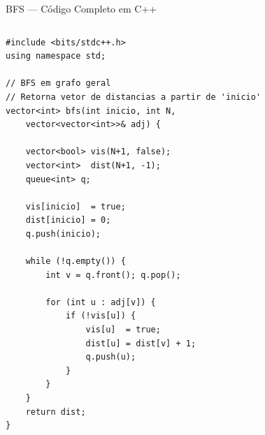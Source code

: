 \documentclass[aspectratio=169,10pt]{beamer}
\begin{document}
\begin{frame}[fragile,shrink=3]{BFS --- Código Completo em C++}
  \begin{columns}[t]
      \begin{tcolorbox}[caixaCodigo]
        \begin{lstlisting}[style=cppsmall]
#include <bits/stdc++.h>
using namespace std;

// BFS em grafo geral
// Retorna vetor de distancias a partir de 'inicio'
vector<int> bfs(int inicio, int N,
    vector<vector<int>>& adj) {

    vector<bool> vis(N+1, false);
    vector<int>  dist(N+1, -1);
    queue<int> q;

    vis[inicio]  = true;
    dist[inicio] = 0;
    q.push(inicio);

    while (!q.empty()) {
        int v = q.front(); q.pop();

        for (int u : adj[v]) {
            if (!vis[u]) {
                vis[u]  = true;
                dist[u] = dist[v] + 1;
                q.push(u);
            }
        }
    }
    return dist;
}


\end{lstlisting}
\end{tcolorbox}
\end{columns}
\end{frame}
\end{document}
